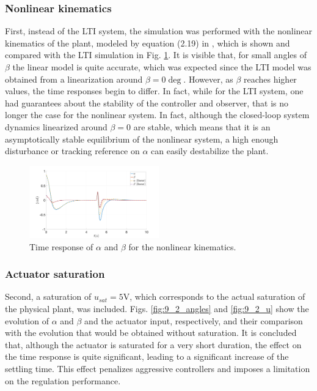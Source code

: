 \documentclass[letterpaper, 10 pt, conference]{ieeeconf}
\begin{document}
\subsubsection{Nonlinear kinematics} First, instead of the LTI system, the simulation was performed with the nonlinear kinematics of the plant, modeled by equation (2.19) in \cite{balula2016nonlinear}, which is shown and compared with the LTI simulation in Fig. \ref{fig:9_1_angles}. It is visible that, for small angles of $\beta$ the linear model is quite accurate, which was expected since the LTI model was obtained from a linearization around $\beta = 0 \deg$. However, as $\beta$ reaches higher values, the time responses begin to differ. In fact, while for the LTI system, one had guarantees about the stability of the controller and observer, that is no longer the case for the nonlinear system. In fact, although the closed-loop system dynamics linearized around $\beta = 0$ are stable, which means that it is an asymptotically stable equilibrium of the nonlinear system, a high enough disturbance or tracking reference on $\alpha$ can easily destabilize the plant. 
\begin{figure}[h]
    \centering
    \includegraphics[width = 0.5\textwidth]{figures/9_1_angles.png}
    \caption{Time response of $\alpha$ and $\beta$ for the nonlinear kinematics.}
    \label{fig:9_1_angles}
\end{figure}

\subsubsection{Actuator saturation} Second, a saturation of $u_{sat} = 5$V, which corresponds to the actual saturation of the physical plant, was included. Figs. \ref{fig:9_2_angles} and \ref{fig:9_2_u} show the evolution of $\alpha$ and $\beta$ and the actuator input, respectively, and their comparison with the evolution that would be obtained without saturation. It is concluded that, although the actuator is saturated for a very short duration, the effect on the time response is quite significant, leading to a significant increase of the settling time. This effect penalizes aggressive controllers and imposes a limitation on the regulation performance.
\end{document}
